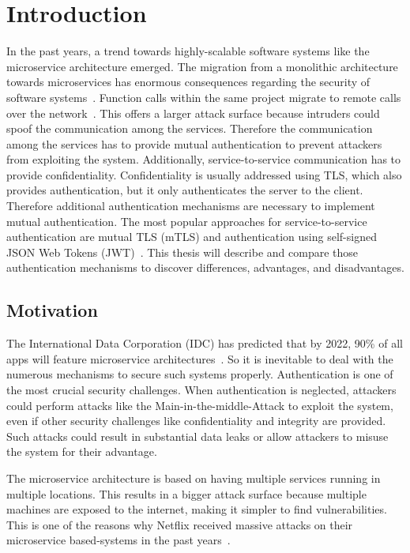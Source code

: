 \chapter{Introduction}
\label{cha:Introduction}
In the past years, a trend towards highly-scalable software systems like the microservice architecture emerged.
The migration from a monolithic architecture towards microservices has enormous consequences regarding the security of software systems~\cite{shmeleva2020microservices}. 
Function calls within the same project migrate to remote calls over the network~\cite{chandramouli2019microservices}. 
This offers a larger attack surface because intruders could spoof the communication among the services.
Therefore the communication among the services has to provide mutual authentication to prevent attackers from exploiting the system.
Additionally, service-to-service communication has to provide confidentiality.
Confidentiality is usually addressed using TLS, which also provides authentication, but it only authenticates the server to the client.
Therefore additional authentication mechanisms are necessary to implement mutual authentication.
The most popular approaches for service-to-service authentication are mutual TLS (mTLS) and authentication using self-signed JSON Web Tokens (JWT)~\cite{dias2020microservices}.
This thesis will describe and compare those authentication mechanisms to discover differences, advantages, and disadvantages.

\section{Motivation}
The International Data Corporation (IDC) has predicted that by 2022, 90\% of all apps will feature microservice architectures~\cite{idcprediction2019}. 
So it is inevitable to deal with the numerous mechanisms to secure such systems properly. 
Authentication is one of the most crucial security challenges.
When authentication is neglected, attackers could perform attacks like the Main-in-the-middle-Attack to exploit the system, even if other security challenges like confidentiality and integrity are provided.
Such attacks could result in substantial data leaks or allow attackers to misuse the system for their advantage.

The microservice architecture is based on having multiple services running in multiple locations.
This results in a bigger attack surface because multiple machines are exposed to the internet, making it simpler to find vulnerabilities.
This is one of the reasons why Netflix received massive attacks on their microservice based-systems in the past years~\cite{pereira2019security}.

